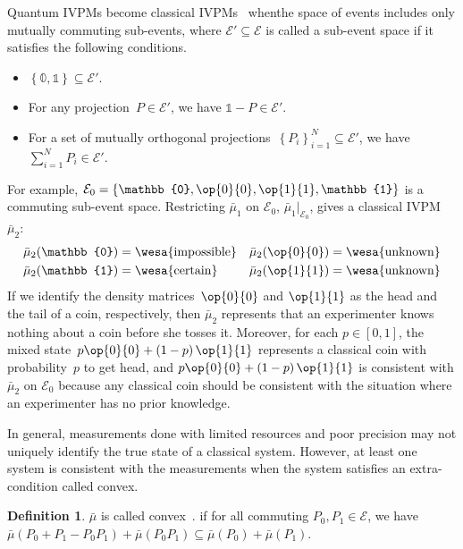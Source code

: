 \documentclass[english,reprint, aps, prl,superscriptaddress, showpacs,
showkeys, longbibliography, amsmath, amssymb]{revtex4-1}
\theoremstyle{plain}
\theoremstyle{definition}
\newtheorem{definition}[thm]{Definition}
\newcommand{\events}{\ensuremath{\mathcal{E}}}
\newcommand{\imposs}{{\text{\wesa{impossible}}}}
\newcommand{\necess}{{\text{\wesa{certain}}}}
\newcommand{\unknown}{{\text{\wesa{unknown}}}}
\newcommand{\proj}[1]{\op{#1}{#1}}
\begin{document}
Quantum IVPMs become classical IVPMs~\cite{JamisonLodwick2004} whenthe space of events includes only mutually commuting sub-events, where
$\events'\subseteq\events$ is called a sub-event space if it satisfies
the following conditions.
\begin{itemize}
\item $\left\{ \mathbb{0},\mathbb{1}\right\} \subseteq\events'$.
\item For any projection~$P\in\events'$, we have $\mathbb{1}-P\in\events'$. 
\item For a set of mutually orthogonal projections~$\left\{ P_{i}\right\} _{i=1}^{N}\subseteq\events'$,
we have $\sum_{i=1}^{N}P_{i}\in\events'$. 
\end{itemize}
For example, $\events_{0}=\left\{ \mathbb{0},\proj{0},\proj{1},\mathbb{1}\right\} $
is a commuting sub-event space. Restricting $\bar{\mu}_{1}$ on $\events_{0}$,
$\bar{\mu}_{1}|_{\events_{0}}$, gives a classical IVPM~$\bar{\mu}_{2}$:
\begin{equation}
\begin{aligned}\bar{\mu}_{2}(\mathbb{0}) & =\imposs & \bar{\mu}_{2}(\proj{0}) & =\unknown\\
\bar{\mu}_{2}(\mathbb{1}) & =\necess & \bar{\mu}_{2}(\proj{1}) & =\unknown
\end{aligned}
\end{equation}
If we identify the density matrices~$\proj{0}$ and $\proj{1}$ as
the head and the tail of a coin, respectively, then $\bar{\mu}_{2}$
represents that an experimenter knows nothing about a coin before
she tosses it. Moreover, for each $p\in\left[0,1\right]$, the mixed
state~$p\proj{0}+\left(1-p\right)\proj{1}$ represents a classical
coin with probability~$p$ to get head, and $p\proj{0}+\left(1-p\right)\proj{1}$
is consistent with $\bar{\mu}_{2}$ on $\events_{0}$ because any
classical coin should be consistent with the situation where an experimenter
has no prior knowledge.

In general, measurements done with limited resources and poor precision
may not uniquely identify the true state of a classical system. However,
at least one system is consistent with the measurements when the system
satisfies an extra-condition called convex.

\begin{definition}
$\bar{\mu}$ is called convex~\cite{Griffiths2003}. if for all
commuting $P_{0},P_{1}\in\events$, we have
$\bar{\mu}\left(P_{0}+P_{1}-P_{0}P_{1}\right)+\bar{\mu}\left(P_{0}P_{1}\right)\subseteq\bar{\mu}\left(P_{0}\right)+\bar{\mu}\left(P_{1}\right)$.
\end{definition}
\end{document}
